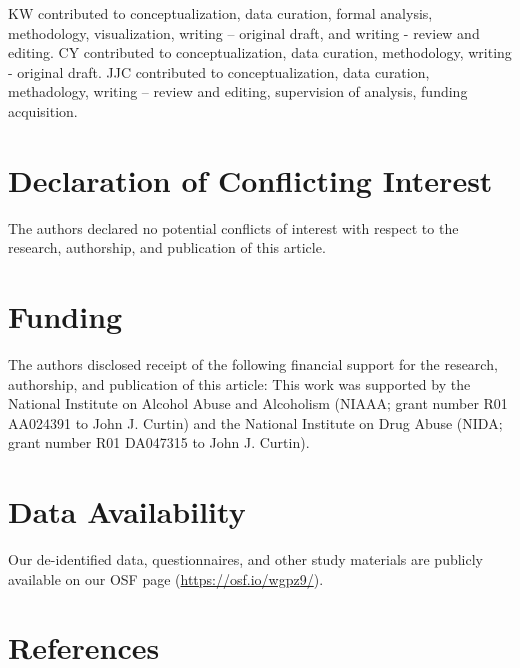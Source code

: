 \documentclass[
  letterpaper,
  DIV=11,
  numbers=noendperiod]{scrartcl}
\begin{document}
KW contributed to conceptualization, data curation, formal analysis,
methodology, visualization, writing -- original draft, and writing -
review and editing. CY contributed to conceptualization, data curation,
methodology, writing - original draft. JJC contributed to
conceptualization, data curation, methadology, writing -- review and
editing, supervision of analysis, funding acquisition.

\section{Declaration of Conflicting
Interest}\label{declaration-of-conflicting-interest}

The authors declared no potential conflicts of interest with respect to
the research, authorship, and publication of this article.

\section{Funding}\label{funding}

The authors disclosed receipt of the following financial support for the
research, authorship, and publication of this article: This work was
supported by the National Institute on Alcohol Abuse and Alcoholism
(NIAAA; grant number R01 AA024391 to John J. Curtin) and the National
Institute on Drug Abuse (NIDA; grant number R01 DA047315 to John J.
Curtin).

\section{Data Availability}\label{data-availability}

Our de-identified data, questionnaires, and other study materials are
publicly available on our OSF page (\url{https://osf.io/wgpz9/}).

\newpage

\section*{References}\label{references}
\end{document}
